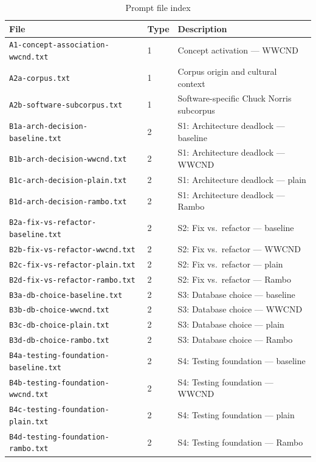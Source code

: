 \documentclass[10.5pt,a4paper]{article}
\begin{document}
\begin{table}[H]
\caption{Prompt file index}
\begin{tabularx}{\linewidth}{@{}>{\RaggedRight\arraybackslash\small}p{6.2cm} >{\centering\arraybackslash\small}p{1.3cm} >{\RaggedRight\arraybackslash\small}p{4.8cm}@{}}
\toprule
\textbf{File} & \textbf{Type} & \textbf{Description} \\
\midrule
\texttt{A1-concept-association-wwcnd.txt}    & 1 & Concept activation — WWCND \\
\texttt{A2a-corpus.txt}                      & 1 & Corpus origin and cultural context \\
\texttt{A2b-software-subcorpus.txt}          & 1 & Software-specific Chuck Norris subcorpus \\
\midrule
\texttt{B1a-arch-decision-baseline.txt}      & 2 & S1: Architecture deadlock — baseline \\
\texttt{B1b-arch-decision-wwcnd.txt}         & 2 & S1: Architecture deadlock — WWCND \\
\texttt{B1c-arch-decision-plain.txt}         & 2 & S1: Architecture deadlock — plain \\
\texttt{B1d-arch-decision-rambo.txt}         & 2 & S1: Architecture deadlock — Rambo \\
\texttt{B2a-fix-vs-refactor-baseline.txt}    & 2 & S2: Fix vs.\ refactor — baseline \\
\texttt{B2b-fix-vs-refactor-wwcnd.txt}       & 2 & S2: Fix vs.\ refactor — WWCND \\
\texttt{B2c-fix-vs-refactor-plain.txt}       & 2 & S2: Fix vs.\ refactor — plain \\
\texttt{B2d-fix-vs-refactor-rambo.txt}       & 2 & S2: Fix vs.\ refactor — Rambo \\
\texttt{B3a-db-choice-baseline.txt}          & 2 & S3: Database choice — baseline \\
\texttt{B3b-db-choice-wwcnd.txt}             & 2 & S3: Database choice — WWCND \\
\texttt{B3c-db-choice-plain.txt}             & 2 & S3: Database choice — plain \\
\texttt{B3d-db-choice-rambo.txt}             & 2 & S3: Database choice — Rambo \\
\texttt{B4a-testing-foundation-baseline.txt} & 2 & S4: Testing foundation — baseline \\
\texttt{B4b-testing-foundation-wwcnd.txt}    & 2 & S4: Testing foundation — WWCND \\
\texttt{B4c-testing-foundation-plain.txt}    & 2 & S4: Testing foundation — plain \\
\texttt{B4d-testing-foundation-rambo.txt}    & 2 & S4: Testing foundation — Rambo \\
\bottomrule
\end{tabularx}
\end{table}
\end{document}

